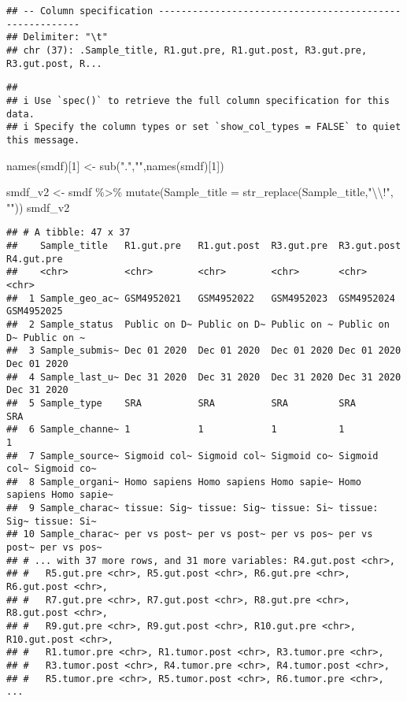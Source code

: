 \documentclass[
]{article}
\newenvironment{Shaded}{\begin{snugshade}}{\end{snugshade}}
\newcommand{\AttributeTok}[1]{\textcolor[rgb]{0.77,0.63,0.00}{#1}}
\newcommand{\DecValTok}[1]{\textcolor[rgb]{0.00,0.00,0.81}{#1}}
\newcommand{\FunctionTok}[1]{\textcolor[rgb]{0.00,0.00,0.00}{#1}}
\newcommand{\NormalTok}[1]{#1}
\newcommand{\OtherTok}[1]{\textcolor[rgb]{0.56,0.35,0.01}{#1}}
\newcommand{\SpecialCharTok}[1]{\textcolor[rgb]{0.00,0.00,0.00}{#1}}
\newcommand{\StringTok}[1]{\textcolor[rgb]{0.31,0.60,0.02}{#1}}
\begin{document}
\begin{verbatim}
## -- Column specification --------------------------------------------------------
## Delimiter: "\t"
## chr (37): .Sample_title, R1.gut.pre, R1.gut.post, R3.gut.pre, R3.gut.post, R...
\end{verbatim}

\begin{verbatim}
## 
## i Use `spec()` to retrieve the full column specification for this data.
## i Specify the column types or set `show_col_types = FALSE` to quiet this message.
\end{verbatim}

\begin{Shaded}
\begin{Highlighting}[]
\FunctionTok{names}\NormalTok{(smdf)[}\DecValTok{1}\NormalTok{] }\OtherTok{\textless{}{-}} \FunctionTok{sub}\NormalTok{(}\StringTok{"."}\NormalTok{,}\StringTok{""}\NormalTok{,}\FunctionTok{names}\NormalTok{(smdf)[}\DecValTok{1}\NormalTok{])}
 
\NormalTok{smdf\_v2 }\OtherTok{\textless{}{-}}\NormalTok{ smdf }\SpecialCharTok{\%\textgreater{}\%}
  \FunctionTok{mutate}\NormalTok{(}\AttributeTok{Sample\_title =} \FunctionTok{str\_replace}\NormalTok{(Sample\_title,}\StringTok{"}\SpecialCharTok{\textbackslash{}\textbackslash{}}\StringTok{!"}\NormalTok{, }\StringTok{""}\NormalTok{))}
\NormalTok{smdf\_v2}
\end{Highlighting}
\end{Shaded}

\begin{verbatim}
## # A tibble: 47 x 37
##    Sample_title   R1.gut.pre   R1.gut.post  R3.gut.pre  R3.gut.post  R4.gut.pre 
##    <chr>          <chr>        <chr>        <chr>       <chr>        <chr>      
##  1 Sample_geo_ac~ GSM4952021   GSM4952022   GSM4952023  GSM4952024   GSM4952025 
##  2 Sample_status  Public on D~ Public on D~ Public on ~ Public on D~ Public on ~
##  3 Sample_submis~ Dec 01 2020  Dec 01 2020  Dec 01 2020 Dec 01 2020  Dec 01 2020
##  4 Sample_last_u~ Dec 31 2020  Dec 31 2020  Dec 31 2020 Dec 31 2020  Dec 31 2020
##  5 Sample_type    SRA          SRA          SRA         SRA          SRA        
##  6 Sample_channe~ 1            1            1           1            1          
##  7 Sample_source~ Sigmoid col~ Sigmoid col~ Sigmoid co~ Sigmoid col~ Sigmoid co~
##  8 Sample_organi~ Homo sapiens Homo sapiens Homo sapie~ Homo sapiens Homo sapie~
##  9 Sample_charac~ tissue: Sig~ tissue: Sig~ tissue: Si~ tissue: Sig~ tissue: Si~
## 10 Sample_charac~ per vs post~ per vs post~ per vs pos~ per vs post~ per vs pos~
## # ... with 37 more rows, and 31 more variables: R4.gut.post <chr>,
## #   R5.gut.pre <chr>, R5.gut.post <chr>, R6.gut.pre <chr>, R6.gut.post <chr>,
## #   R7.gut.pre <chr>, R7.gut.post <chr>, R8.gut.pre <chr>, R8.gut.post <chr>,
## #   R9.gut.pre <chr>, R9.gut.post <chr>, R10.gut.pre <chr>, R10.gut.post <chr>,
## #   R1.tumor.pre <chr>, R1.tumor.post <chr>, R3.tumor.pre <chr>,
## #   R3.tumor.post <chr>, R4.tumor.pre <chr>, R4.tumor.post <chr>,
## #   R5.tumor.pre <chr>, R5.tumor.post <chr>, R6.tumor.pre <chr>, ...
\end{verbatim}
\end{document}
